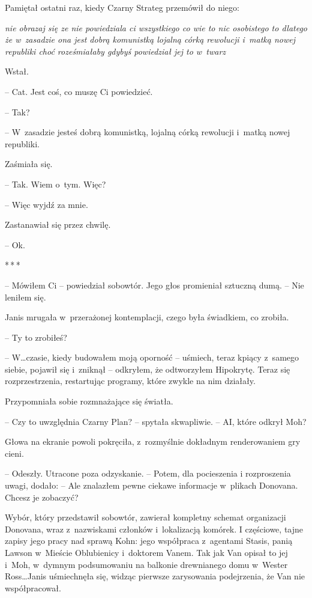 \documentclass[oneside,polish,11pt,sfheadings]{mwbk}
\newcommand{\threeast}{\bigskip\par\centerline{*\,*\,*}\medskip\par}%
\begin{document}
Pamiętał ostatni raz, kiedy Czarny Strateg przemówił do niego:

\emph{nie obrazaj się ze nie powiedziala ci wszystkiego co wie to nic
osobistego to dlatego że w~zasadzie ona jest dobrą komunistką lojalną
córką rewolucji i~matką nowej republiki choć roześmiałaby gdybyś
powiedział jej to w~twarz}

Wstał.

-- Cat. Jest coś, co muszę Ci powiedzieć.

-- Tak?

-- W~zasadzie jesteś dobrą komunistką, lojalną córką rewolucji i~matką
nowej republiki.

Zaśmiała się. 

-- Tak. Wiem o~tym. Więc?

-- Więc wyjdź za mnie.

Zastanawiał się przez chwilę.

-- Ok.

\threeast

-- Mówiłem Ci -- powiedział sobowtór. Jego głos promieniał sztuczną dumą.
-- Nie leniłem się.

Janis mrugała w~przerażonej kontemplacji, czego była świadkiem, co
zrobiła.

-- Ty to zrobiłeś?

-- W\ldots czasie, kiedy budowałem moją oporność -- uśmiech, teraz kpiący z~samego siebie, pojawił się i~zniknął -- odkryłem, że odtworzyłem
Hipokrytę. Teraz się rozprzestrzenia, restartując programy, które zwykle
na nim działały.

Przypomniała sobie rozmnażające się światła.

-- Czy to uwzględnia Czarny Plan? -- spytała skwapliwie. -- AI, które
odkrył Moh?

Głowa na ekranie powoli pokręciła, z~rozmyślnie dokładnym renderowaniem
gry cieni. 

-- Odeszły. Utracone poza odzyskanie. -- Potem, dla pocieszenia
i rozproszenia uwagi, dodało: -- Ale znalazłem pewne ciekawe informacje w~plikach Donovana. Chcesz je zobaczyć?

Wybór, który przedstawił sobowtór, zawierał kompletny schemat
organizacji Donovana, wraz z~nazwiskami członków i~lokalizacją komórek.
I częściowe, tajne zapisy jego pracy nad sprawą Kohn: jego współpraca z~agentami Stasis, panią Lawson w~Mieście Oblubienicy i~doktorem Vanem.
Tak jak Van opisał to jej i~Moh, w~dymnym podsumowaniu na balkonie
drewnianego domu w~Wester Ross\ldots Janis uśmiechnęła się, widząc pierwsze
zarysowania podejrzenia, że Van nie współpracował.
\end{document}
